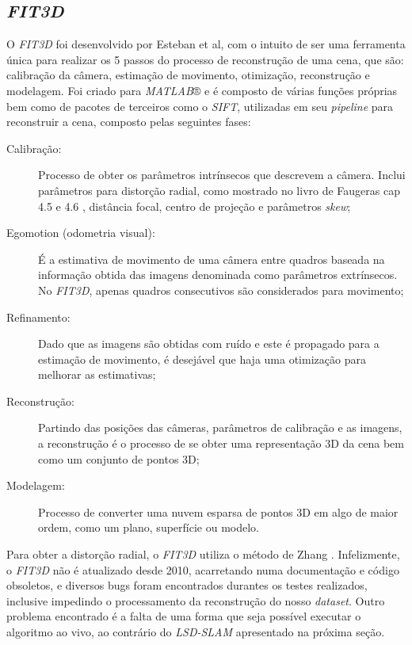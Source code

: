 \subsection{\textit{FIT3D}}
O \textit{FIT3D} foi desenvolvido por Esteban et al\cite{FIT3D}, com o intuito de ser uma ferramenta única para realizar os 5 passos do processo de reconstrução de uma cena, que são: calibração da câmera, estimação de movimento, otimização, reconstrução e modelagem. Foi criado para \textit{MATLAB}® e é composto de várias funções próprias bem como de pacotes de terceiros como o \textit{SIFT}, utilizadas em seu \textit{pipeline} para reconstruir a cena, composto pelas seguintes fases:
\begin{description}
 \item[Calibração: ]{Processo de obter os parâmetros intrínsecos que descrevem a câmera. Inclui parâmetros para distorção radial, como mostrado no livro de Faugeras cap 4.5 e 4.6 \cite{Faugeras-Geometry}, distância focal, centro de projeção e parâmetros \textit{skew};}
 \item[Egomotion (odometria visual): ]{É a estimativa de movimento de uma câmera entre quadros baseada na informação obtida das imagens denominada como parâmetros extrínsecos. No \textit{FIT3D}, apenas quadros consecutivos são considerados para movimento;}
 \item[Refinamento: ]{Dado que as imagens são obtidas com ruído e este é propagado para a estimação de movimento, é desejável que haja uma otimização para melhorar as estimativas;}
 \item[Reconstrução: ]{Partindo das posições das câmeras, parâmetros de calibração e as imagens, a reconstrução é o processo de se obter uma representação 3D da cena bem como um conjunto de pontos 3D;}
 \item[Modelagem: ]{Processo de converter uma nuvem esparsa de pontos 3D em algo de maior ordem, como um plano, superfície ou modelo.}
\end{description}
  
 Para obter a distorção radial, o \textit{FIT3D} utiliza o método de Zhang \cite{FIT3D}. Infelizmente, o \textit{FIT3D} não é atualizado desde 2010, acarretando numa documentação e código obsoletos, e diversos bugs foram encontrados durantes os testes realizados, inclusive impedindo o processamento da reconstrução do nosso \textit{dataset}. Outro problema encontrado é a falta de uma forma que seja possível executar o algoritmo ao vivo, ao contrário do \textit{LSD-SLAM} apresentado na próxima seção.
  

